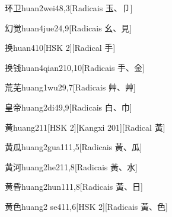 \begin{entry}{环卫}{huan2wei4}{8,3}[Radicais ⽟、⼙]
\end{entry}

\begin{entry}{幻觉}{huan4jue2}{4,9}[Radicais ⼳、⾒]
\end{entry}

\begin{entry}{换}{huan4}{10}[HSK 2][Radical ⼿]
\end{entry}

\begin{entry}{换钱}{huan4qian2}{10,10}[Radicais ⼿、⾦]
\end{entry}

\begin{entry}{荒芜}{huang1wu2}{9,7}[Radicais ⾋、⾋]
\end{entry}

\begin{entry}{皇帝}{huang2di4}{9,9}[Radicais ⽩、⼱]
\end{entry}

\begin{entry}{黄}{huang2}{11}[HSK 2][Kangxi 201][Radical ⿈]
\end{entry}

\begin{entry}{黄瓜}{huang2gua1}{11,5}[Radicais ⿈、⽠]
\end{entry}

\begin{entry}{黄河}{huang2he2}{11,8}[Radicais ⿈、⽔]
\end{entry}

\begin{entry}{黄昏}{huang2hun1}{11,8}[Radicais ⿈、⽇]
\end{entry}

\begin{entry}{黄色}{huang2 se4}{11,6}[HSK 2][Radicais ⿈、⾊]
\end{entry}

